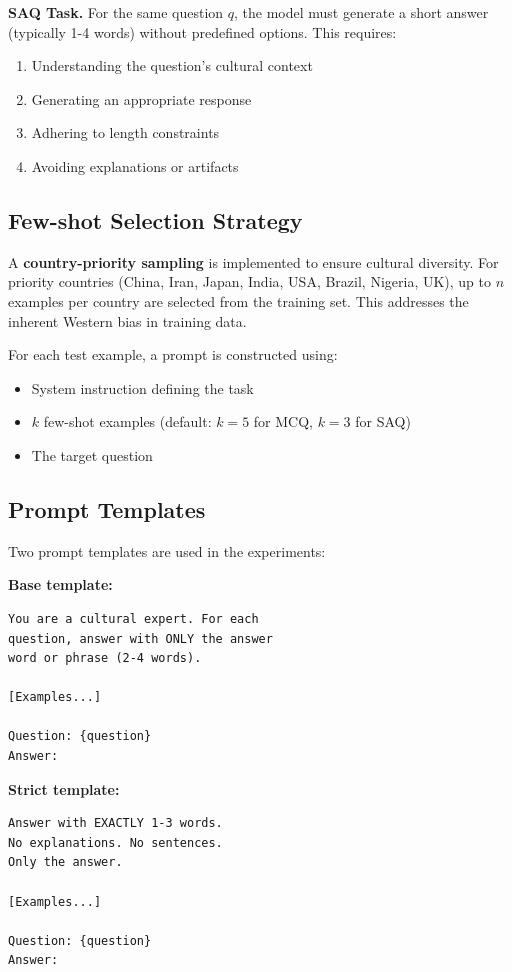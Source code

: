 \documentclass[11pt,a4paper,twocolumn]{article}
\begin{document}
\textbf{SAQ Task.} For the same question $q$, the model must generate a short answer (typically 1-4 words) without predefined options. This requires:
\begin{enumerate}
\item Understanding the question's cultural context
\item Generating an appropriate response
\item Adhering to length constraints
\item Avoiding explanations or artifacts
\end{enumerate}

\subsection{Few-shot Selection Strategy}

A \textbf{country-priority sampling} is implemented to ensure cultural diversity. For priority countries (China, Iran, Japan, India, USA, Brazil, Nigeria, UK), up to $n$ examples per country are selected from the training set. This addresses the inherent Western bias in training data.

For each test example, a prompt is constructed using:
\begin{itemize}
\item System instruction defining the task
\item $k$ few-shot examples (default: $k=5$ for MCQ, $k=3$ for SAQ)
\item The target question
\end{itemize}

\subsection{Prompt Templates}

Two prompt templates are used in the experiments:

\textbf{Base template:}
\begin{verbatim}
You are a cultural expert. For each
question, answer with ONLY the answer
word or phrase (2-4 words).

[Examples...]

Question: {question}
Answer:
\end{verbatim}

\textbf{Strict template:}
\begin{verbatim}
Answer with EXACTLY 1-3 words. 
No explanations. No sentences.
Only the answer.

[Examples...]

Question: {question}
Answer:
\end{verbatim}
\end{document}
